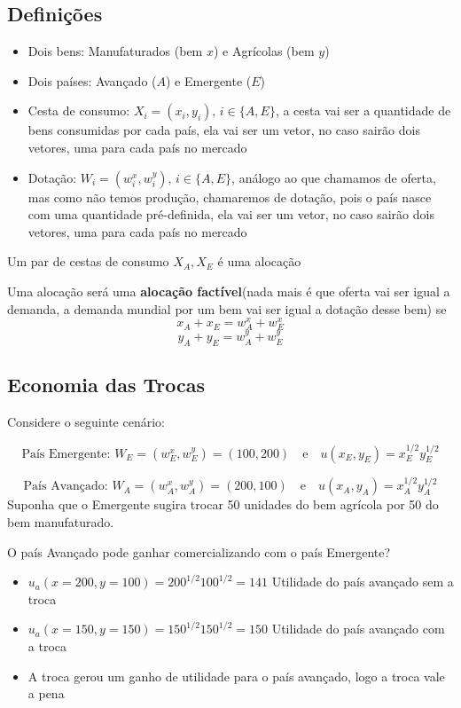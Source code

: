 \documentclass[a4paper,12pt]{article}[abntex2]
\begin{document}
\subsection{\textbf{Definições}}

\begin{itemize}
    \item Dois bens: Manufaturados (bem $x$) e Agrícolas (bem $y$)
    \item Dois países: Avançado ($A$) e Emergente ($E$)
    \item Cesta de consumo: $X_i = (x_i, y_i), \, i \in \{A, E\}$, a cesta vai ser a quantidade de bens consumidas por cada país, ela vai ser um vetor, no caso sairão dois vetores, uma para cada país no mercado
    \item Dotação: $W_i = (w_i^x, w_i^y), \, i \in \{A, E\}$, análogo ao que chamamos de oferta, mas como não temos produção, chamaremos de dotação, pois o país nasce com uma quantidade pré-definida, ela vai ser um vetor, no caso sairão dois vetores, uma para cada país no mercado
\end{itemize}

Um par de cestas de consumo $X_A, X_E$ é uma alocação

Uma alocação será uma \textbf{alocação factível}(nada mais é que oferta vai ser igual a demanda, a demanda mundial por um bem vai ser igual a dotação desse bem) se
\[
x_A + x_E = w_A^x + w_E^x
\]
\[
y_A + y_E = w_A^y + w_E^y
\]

\subsection{\textbf{Economia das Trocas}}

Considere o seguinte cenário:

\[
\text{País Emergente: } W_E = (w_E^x, w_E^y) = (100, 200) \quad \text{e} \quad u(x_E, y_E) = x_E^{1/2} y_E^{1/2}
\]

\[
\text{País Avançado: } W_A = (w_A^x, w_A^y) = (200, 100) \quad \text{e} \quad u(x_A, y_A) = x_A^{1/2} y_A^{1/2}
\]
Suponha que o Emergente sugira trocar 50 unidades do bem agrícola por 50 do bem manufaturado.

O país Avançado pode ganhar comercializando com o país Emergente?\begin{itemize}
    \item $u_a(x=200,y=100)=200^{1/2}100^{1/2}=141$ Utilidade do país avançado sem a troca
    \item $u_a(x=150,y=150)=150^{1/2}150^{1/2}=150$ Utilidade do país avançado com a troca
    \item A troca gerou um ganho de utilidade para o país avançado, logo a troca vale a pena
\end{itemize}
\end{document}
